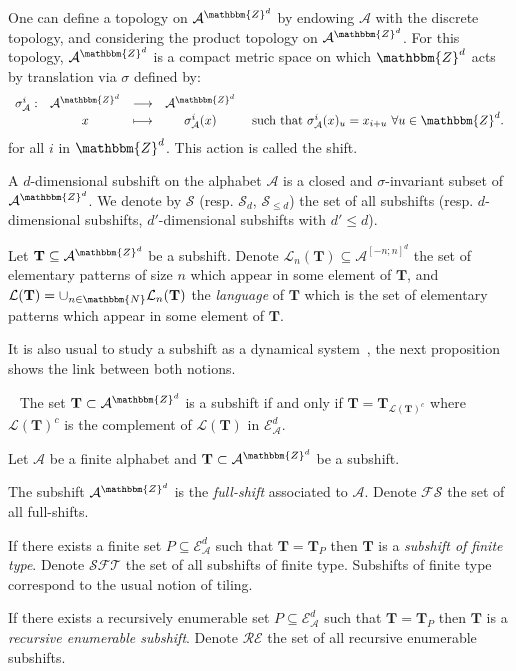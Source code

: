 \documentclass[proceedings]{stacs}
\theoremstyle{plain}\newtheorem{satz}[thm]{Satz}
\theoremstyle{definition}\newtheorem{crucial}[thm]{Crucial Definition}
\newcommand{\Z}{\mathbbm{Z}}
\newcommand{\N}{\mathbbm{N}}
\newcommand{\A}{\mathcal{A}}
\newcommand{\E}{\mathcal{E}}
\newcommand{\T}{\mathbf{T}}
\newcommand{\s}{\sigma}
\newcommand{\SFT}{\mathcal{SFT}}
\newcommand{\shift}{\mathcal{S}}
\newcommand{\reshift}{\mathcal{RE}}
\newcommand{\fshift}{\mathcal{FS}}
\newcommand{\Lang}{\mathcal{L}}
\begin{document}
One can define a topology on $\A^{\mathbbm{Z}^d}$ by endowing $\A$ with the discrete topology, and considering the product topology on $\A^{\mathbbm{Z}^d}$. For this topology,  $\A^{\mathbbm{Z}^d}$ is a compact metric space on which $\mathbbm{Z}^d$ acts by translation via $\s$ defined by: 
$$\begin{array}{ccccc}
\s_{\A}^i:&\A^{\mathbbm{Z}^d} & \longrightarrow &\A^{\mathbbm{Z}^d}&\\
&x&\longmapsto & \s_{\A}^i(x)& \textrm{ such that } \s_{\A}^i(x)_u=x_{i+u} \ \forall u\in\Z^d.
\end{array}$$
for all $i$ in $\mathbbm{Z}^d$. This action is called the shift.

\begin{definition}\label{language}
A $d$-dimensional subshift on the alphabet $\A$ is a closed and $\s$-invariant subset of $\A^{\mathbbm{Z}^d}$. We denote by $\shift$ (resp. $\shift_d$, $\shift_{\leq d}$) the set of all subshifts (resp. $d$-dimensional subshifts, $d'$-dimensional subshifts with $d'\leq d$). 

Let $\T\subseteq \A^{\Z^d}$ be a subshift. Denote $\Lang_n(\T)\subseteq\A^{[-n;n]^d}$ the set of elementary patterns of size $n$ which appear in some element of $\T$, and $\Lang(\T)=\cup_{n\in\N} \Lang_n(\T)$ the \emph{language} of $\T$ which is the set of elementary patterns which appear in some element of  $\T$.
\end{definition}

It is also usual to study a subshift as a dynamical system~\cite{lind1995isd,kitchens1998sd}, the next proposition shows the link between both notions.

\begin{proposition}~\label{tiling-subshift}
The set $\T\subset\A^{\Z^d}$ is a subshift if and only if $\T=\T_{\Lang(\T)^c}$ where $\Lang(\T)^c$ is the complement of $\Lang(\T)$ in $\mathcal{E}_{\A}^d$.
\end{proposition}
\begin{definition}
Let $\A$ be a finite alphabet and $\T\subset\A^{\Z^d}$ be a subshift.

The subshift $\A^{\Z^d}$ is the \emph{full-shift} associated to $\A$. Denote $\fshift$ the set of all full-shifts.

If there exists a finite set $P\subseteq\E^d_{\A}$ such that $\T=\T_P$ then $\T$ is a \emph{subshift of finite type}. Denote $\SFT$ the set of all subshifts of finite type. Subshifts of finite type correspond to the usual notion of tiling.

If there exists a recursively enumerable set $P\subseteq\E^d_{\A}$ such that $\T=\T_P$ then $\T$ is a \emph{recursive enumerable subshift}. Denote $\reshift$ the set of all recursive enumerable subshifts.
\end{definition}
\vspace{-0,5cm}
\end{document}
